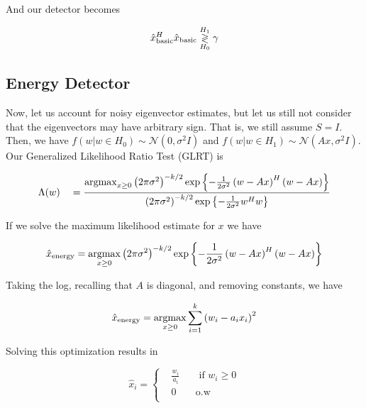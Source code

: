 \documentclass[english]{article}
\begin{document}
And our detector becomes

\begin{equation}\label{eq:basic det}
\hat{x}_{\text{basic}}^H\hat{x}_{\text{basic}} \overset{H_1}{\underset{H_0}{\gtrless}} \gamma
\end{equation}

\subsection{Energy Detector}

 Now, let us account for noisy eigenvector estimates, but let us still not consider that the eigenvectors may have arbitrary sign. That is, we still assume $S=I$. Then, we have $f(w|w\in H_0)\sim\mathcal{N}(0,\sigma^2I)$ and $f(w|w\in H_1)\sim\mathcal{N}(Ax,\sigma^2I)$. Our Generalized Likelihood Ratio Test (GLRT) is

\begin{equation}
\begin{aligned}
&\Lambda(w)
&&=\frac{\mathop{\rm argmax}_{x\geq0}\left(2\pi\sigma^2\right)^{-k/2}\exp\left\{-\frac{1}{2\sigma^2}\left(w-Ax\right)^H\left(w-Ax\right)\right\}}{\left(2\pi\sigma^2\right)^{-k/2}\exp\left\{-\frac{1}{2\sigma^2}w^Hw\right\}}\\
\end{aligned}
\end{equation}

If we solve the maximum likelihood estimate for $x$ we have

\begin{equation}
\hat{x}_{\text{energy}}=\mathop{\rm argmax}_{x\geq0}\left(2\pi\sigma^2\right)^{-k/2}\exp\left\{-\frac{1}{2\sigma^2}\left(w-Ax\right)^H\left(w-Ax\right)\right\}
\end{equation}

Taking the log, recalling that $A$ is diagonal, and removing constants, we have

\begin{equation}
\hat{x}_{\text{energy}}=\mathop{\rm argmax}_{x\geq0}\sum_{i=1}^k\left(w_i-a_ix_i\right)^2
\end{equation}

Solving this optimization results in

\begin{equation}
\hat{x}_i = \left\{
\begin{aligned}
&\frac{w_i}{a_i}
&&\text{ if } w_i\geq 0\\
&0
&&\text{o.w}\\
\end{aligned}\right.
\end{equation}
\end{document}
